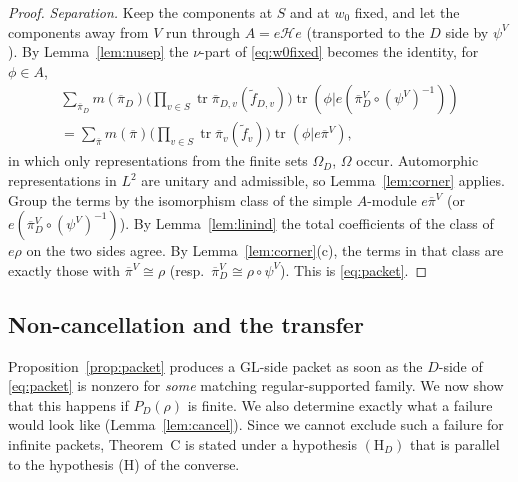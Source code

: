 \documentclass[12pt]{article}
\newcommand{\ov}[1]{\overline{#1}}
\newcommand{\tr}{\operatorname{tr}}
\newcommand{\GL}{\mathrm{GL}}
\newcommand{\pib}{\ov{\pi}}
\theoremstyle{plain}
\theoremstyle{definition}
\begin{document}
\begin{proof}
\emph{Separation.} Keep the components at $S$ and at $w_0$ fixed, and let the components away from $V$ run through $A=e\mathcal He$ (transported to the $D$ side by $\psi^V$). By Lemma~\ref{lem:nusep} the $\nu$-part of \eqref{eq:w0fixed} becomes the identity, for $\phi\in A$,
\begin{multline*} \sum_{\pib_D}m(\pib_D)\Big(\prod_{v\in S}\tr\pib_{D,v}(\tilde f_{D,v})\Big)\tr(\phi|e(\pib_D^V\circ(\psi^V)^{-1}))\\=\sum_{\pib}m(\pib)\Big(\prod_{v\in S}\tr\pib_v(\tilde f_v)\Big)\tr(\phi|e\pib^V), \end{multline*}
in which only representations from the finite sets $\Omega_D$, $\Omega$ occur. Automorphic representations in $L^2$ are unitary and admissible, so Lemma~\ref{lem:corner} applies. Group the terms by the isomorphism class of the simple $A$-module $e\pib^V$ (or $e(\pib_D^V\circ(\psi^V)^{-1})$). By Lemma~\ref{lem:linind} the total coefficients of the class of $e\rho$ on the two sides agree. By Lemma~\ref{lem:corner}(c), the terms in that class are exactly those with $\pib^V\cong\rho$ (resp.\ $\pib_D^V\cong\rho\circ\psi^V$). This is \eqref{eq:packet}.
\end{proof}

\subsection{Non-cancellation and the transfer}\label{subsec:transfer}
Proposition~\ref{prop:packet} produces a $\GL$-side packet as soon as the $D$-side of \eqref{eq:packet} is nonzero for \emph{some} matching regular-supported family. We now show that this happens if $P_D(\rho)$ is finite. We also determine exactly what a failure would look like (Lemma~\ref{lem:cancel}). Since we cannot exclude such a failure for infinite packets, Theorem~C is stated under a hypothesis $(\mathrm H_D)$ that is parallel to the hypothesis (H) of the converse.
\end{document}
